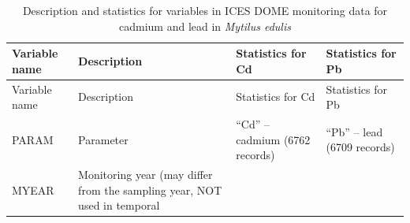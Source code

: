 \documentclass[
  12pt,
]{article}
\begin{document}
\begin{longtable}[]{@{}llll@{}}
\caption{Description and statistics for variables in ICES DOME
monitoring data for cadmium and lead in \emph{Mytilus
edulis}}\tabularnewline
\toprule
\begin{minipage}[b]{0.15\columnwidth}\raggedright
Variable name\strut
\end{minipage} & \begin{minipage}[b]{0.22\columnwidth}\raggedright
Description\strut
\end{minipage} & \begin{minipage}[b]{0.25\columnwidth}\raggedright
Statistics for Cd\strut
\end{minipage} & \begin{minipage}[b]{0.25\columnwidth}\raggedright
Statistics for Pb\strut
\end{minipage}\tabularnewline
\midrule
\endfirsthead
\toprule
\begin{minipage}[b]{0.15\columnwidth}\raggedright
Variable name\strut
\end{minipage} & \begin{minipage}[b]{0.22\columnwidth}\raggedright
Description\strut
\end{minipage} & \begin{minipage}[b]{0.25\columnwidth}\raggedright
Statistics for Cd\strut
\end{minipage} & \begin{minipage}[b]{0.25\columnwidth}\raggedright
Statistics for Pb\strut
\end{minipage}\tabularnewline
\midrule
\endhead
\begin{minipage}[t]{0.15\columnwidth}\raggedright
PARAM\strut
\end{minipage} & \begin{minipage}[t]{0.22\columnwidth}\raggedright
Parameter\strut
\end{minipage} & \begin{minipage}[t]{0.25\columnwidth}\raggedright
``Cd'' -- cadmium (6762 records)\strut
\end{minipage} & \begin{minipage}[t]{0.25\columnwidth}\raggedright
``Pb'' -- lead (6709 records)\strut
\end{minipage}\tabularnewline
\begin{minipage}[t]{0.15\columnwidth}\raggedright
MYEAR\strut
\end{minipage} & \begin{minipage}[t]{0.22\columnwidth}\raggedright
Monitoring year (may differ from the sampling year, NOT used in temporal

\end{minipage}
\end{longtable}
\end{document}
